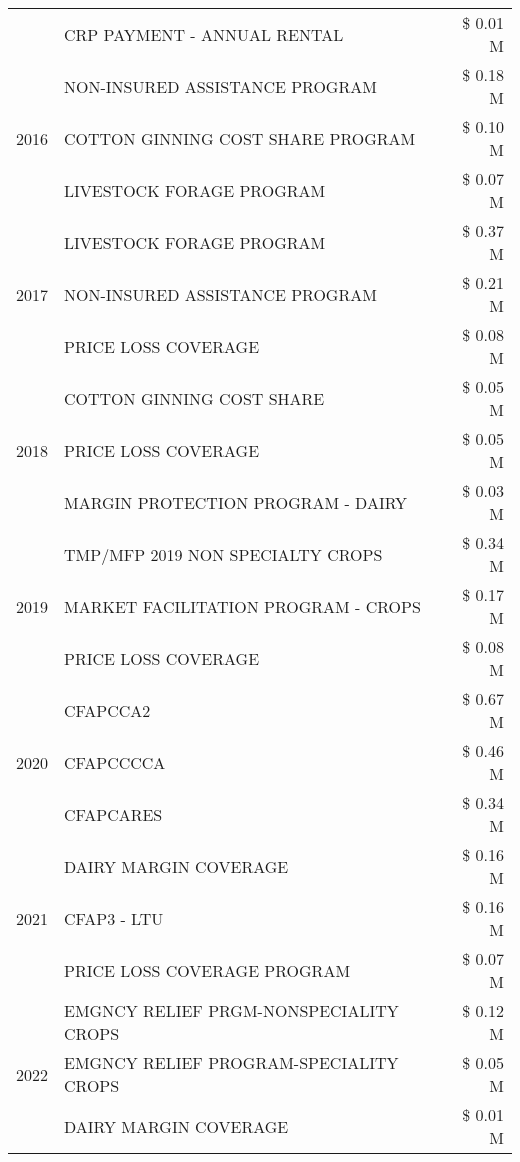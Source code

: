 \begin{tabular}{llr}
 & CRP PAYMENT - ANNUAL RENTAL & \$ 0.01 M \\
\cline{1-3}
\multirow[t]{3}{*}{2016} & NON-INSURED ASSISTANCE PROGRAM & \$ 0.18 M \\
 & COTTON GINNING COST SHARE PROGRAM & \$ 0.10 M \\
 & LIVESTOCK FORAGE PROGRAM & \$ 0.07 M \\
\cline{1-3}
\multirow[t]{3}{*}{2017} & LIVESTOCK FORAGE PROGRAM & \$ 0.37 M \\
 & NON-INSURED ASSISTANCE PROGRAM & \$ 0.21 M \\
 & PRICE LOSS COVERAGE & \$ 0.08 M \\
\cline{1-3}
\multirow[t]{3}{*}{2018} & COTTON GINNING COST SHARE & \$ 0.05 M \\
 & PRICE LOSS COVERAGE & \$ 0.05 M \\
 & MARGIN PROTECTION PROGRAM - DAIRY & \$ 0.03 M \\
\cline{1-3}
\multirow[t]{3}{*}{2019} & TMP/MFP 2019 NON SPECIALTY CROPS & \$ 0.34 M \\
 & MARKET FACILITATION PROGRAM - CROPS & \$ 0.17 M \\
 & PRICE LOSS COVERAGE & \$ 0.08 M \\
\cline{1-3}
\multirow[t]{3}{*}{2020} & CFAPCCA2 & \$ 0.67 M \\
 & CFAPCCCCA & \$ 0.46 M \\
 & CFAPCARES & \$ 0.34 M \\
\cline{1-3}
\multirow[t]{3}{*}{2021} & DAIRY MARGIN COVERAGE & \$ 0.16 M \\
 & CFAP3 - LTU & \$ 0.16 M \\
 & PRICE LOSS COVERAGE PROGRAM & \$ 0.07 M \\
\cline{1-3}
\multirow[t]{3}{*}{2022} & EMGNCY RELIEF PRGM-NONSPECIALITY CROPS & \$ 0.12 M \\
 & EMGNCY RELIEF PROGRAM-SPECIALITY CROPS & \$ 0.05 M \\
 & DAIRY MARGIN COVERAGE & \$ 0.01 M \\
\cline{1-3}
\bottomrule
\end{tabular}
